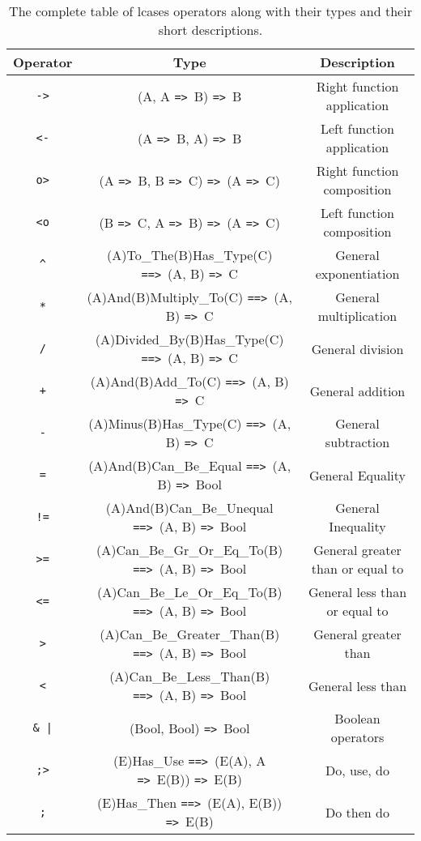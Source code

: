 \documentclass{article}
\def\ra{\texttt{=>}\ }
\def\Ra{\texttt{==>}\ }
\begin{document}
\begin{table}[h]

\caption{
The complete table of lcases operators along with their types and 
their short descriptions.
}

\begin{center}
\begin{tabular}{ |c|c|c| } 
\hline
Operator & Type & Description \\ 
\hline
\hline
\texttt{->} & (A, A \ra B) \ra B & Right function application \\
\hline
\texttt{<-} & (A \ra B, A) \ra B & Left function application \\
\hline
\texttt{o>} & (A \ra B, B \ra C) \ra (A \ra C) & Right function composition \\
\hline
\texttt{<o} & (B \ra C, A \ra B) \ra (A \ra C) & Left function composition \\
\hline
\texttt{\^} & (A)To_The(B)Has_Type(C) \Ra (A, B) \ra C & General exponentiation  \\
\hline
\texttt{*} & (A)And(B)Multiply_To(C) \Ra (A, B) \ra C & General multiplication  \\
\hline
\texttt{/} & (A)Divided_By(B)Has_Type(C) \Ra (A, B) \ra C & General division \\
\hline
\texttt{+} & (A)And(B)Add_To(C) \Ra (A, B) \ra C & General addition \\ 
\hline
\texttt{-} & (A)Minus(B)Has_Type(C) \Ra (A, B) \ra C & General subtraction \\
\hline
\texttt{=} & (A)And(B)Can_Be_Equal \Ra (A, B) \ra Bool & General Equality \\
\hline
\texttt{!=} & (A)And(B)Can_Be_Unequal \Ra (A, B) \ra Bool & General Inequality \\
\hline
\texttt{>=} & (A)Can_Be_Gr_Or_Eq_To(B) \Ra (A, B) \ra Bool
& General greater than or equal to \\
\hline
\texttt{<=} & (A)Can_Be_Le_Or_Eq_To(B) \Ra (A, B) \ra Bool
& General less than or equal to \\
\hline
\texttt{>} & (A)Can_Be_Greater_Than(B) \Ra (A, B) \ra Bool & General greater than \\
\hline
\texttt{<} & (A)Can_Be_Less_Than(B) \Ra (A, B) \ra Bool & General less than \\
\hline
\texttt{\& |} & (Bool, Bool) \ra Bool & Boolean operators \\
\hline
\texttt{;>} & (E)Has_Use \Ra (E(A), A \ra E(B)) \ra E(B) &
Do, use, do \\
\hline
\texttt{;} & (E)Has_Then \Ra (E(A), E(B)) \ra E(B) &
Do then do \\
\hline
\end{tabular}
\end{center}

\label{table:allops}

\end{table}
\end{document}

